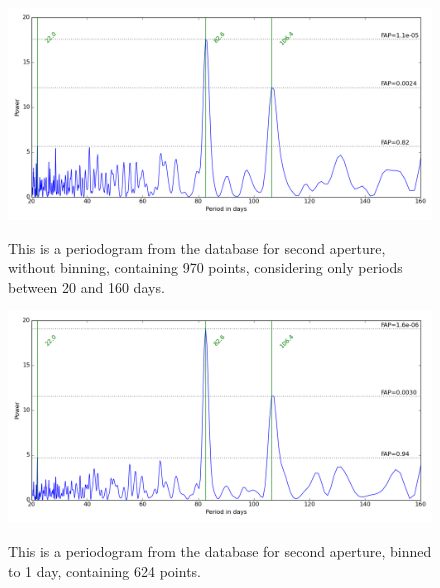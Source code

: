 \begin{figure}[!htbp]
\begin{center}
\includegraphics[scale=0.30]{Figures/asasnobin.png} \\
\end{center}
\caption{This is a periodogram from the {\asas} database for {\prox} second aperture, without binning, containing 970
  points, considering only periods between 20 and 160 days.}
\protect\label{fig:asaspgram1}
\end{figure}

\begin{figure}[!htbp]
\begin{center}
\includegraphics[scale=0.30]{Figures/asasbin1.png} \\
\end{center}
\caption{This is a periodogram from the {\asas} database for {\prox} second aperture, binned to 1 day, containing 624 points.}
\protect\label{fig:asaspgram2}
\end{figure}


